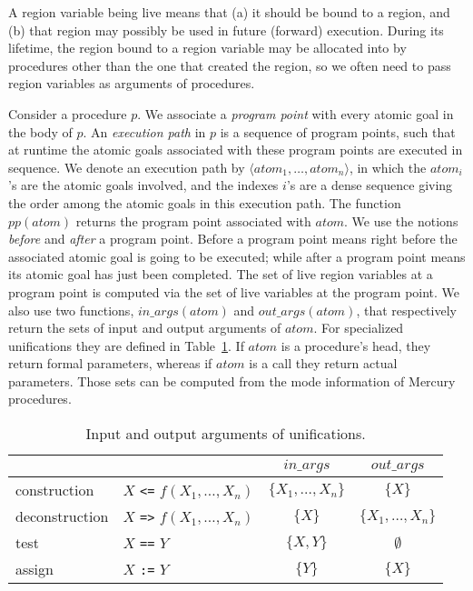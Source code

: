 \documentclass{tlp}
\newcommand{\ep}{\ensuremath{\langle {atom}_1, \ldots, {atom}_n \rangle}}
\newcommand{\inargs}[1]{\ensuremath{\mathit{in\_args}(#1)}}
\newcommand{\outargs}[1]{\ensuremath{\mathit{out\_args}(#1)}}
\newcommand{\pp}[1]{\ensuremath{\mathit{pp}(#1)}}
\newcommand{\code}[1]{{\tt#1}}
\begin{document}
A region variable being live means that
(a) it should be bound to a region, and
(b) that region may possibly be used in future (forward) execution.
During its lifetime, the region bound to a region variable
may be allocated into by procedures other than the one that created the region,
so we often need to pass region variables as arguments of procedures.

Consider a procedure $p$.
We associate a \emph{program point} with every atomic goal in the body of $p$.
An \emph{execution path} in $p$ is a sequence of program points,
such that at runtime the atomic goals associated with these program points
are executed in sequence.
We denote an execution path by \ep,
in which the ${atom}_i$'s are the atomic goals involved, and
the indexes $i$'s are a dense sequence
giving the order among the atomic goals in this execution path.
The function \pp{{atom}} returns the program point associated with ${atom}$.
We use the notions
\emph{before} and \emph{after} a program point.
Before a program point means
right before the associated atomic goal is going to be executed;
while after a program point means its atomic goal has just been completed.
The set of live region variables at a program point is computed via the set
of live variables at the program point.
We also use two functions,
$\inargs{\mathit{atom}}$ and $\outargs{\mathit{atom}}$,
that respectively return
the sets of input and output arguments of $\mathit{atom}$.
For specialized unifications they are defined in Table~\ref{table:lva:unif}.
If $\mathit{atom}$ is a procedure's head, they return formal parameters,
whereas if $\mathit{atom}$ is a call they return actual parameters.
Those sets can be computed from the mode information of Mercury procedures.
\begin{table}[htb]
  \caption{Input and output arguments of unifications.}
  \begin{tabular}{l|l|*{2}{c|}}
    \hline
    \hline
    & & $\mathit{in\_args}$ & $\mathit{out\_args}$\\
    \hline
    construction   & $X$ \code{<=} $f(X_1,\dots, X_n)$ &  $\{X_1,\dots,X_n\}$  & $\{X\}$             \\
    deconstruction & $X$ \code{=>} $f(X_1,\dots, X_n)$ &  $\{X\}$               & $\{X_1,\dots,X_n\}$ \\
    test           & $X$ \code{==} $Y$                 &  $\{X,Y\}$             & $\emptyset$         \\
    assign         & $X$ \code{:=} $Y$                 &  $\{Y\}$           & $\{X\}$             \\
    \hline
    \hline
  \end{tabular}
  \label{table:lva:unif}
\end{table}
\end{document}
